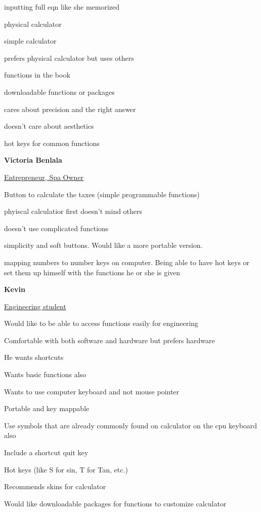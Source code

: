 \documentclass[a4paper, 12pt]{article}
\begin{document}
\begin{compactitem}
\item inputting full eqn like she memorized
\item physical calculator 
\item simple calculator
\item prefers physical calculator but uses others
\item functions in the book
\item downloadable functions or packages
\item cares about precision and the right answer
\item doesn’t care about aesthetics
\item hot keys for common functions
\end{compactitem}
\bigskip

\textbf{Victoria  Benlala}

\underline{Entrepreneur, Spa Owner}

\begin{compactitem}
\item Button to calculate the taxes (simple programmable functions)
\item phyiscal calculatior first doesn’t mind others
\item doesn’t use complicated functions
\item simplicity and soft buttons. Would like a more portable version.
\item mapping numbers to number keys on computer. Being able to have hot keys or set them up himself with the functions he or she is given
\end{compactitem}
\bigskip

\textbf{Kevin}

\underline{Engineering student}

\begin{compactitem}
\item Would like to be able to access functions easily for engineering 
\item Comfortable with both software and hardware but prefers hardware
\item He wants shortcuts
\item Wants basic functions also
\item Wants to use computer keyboard and not mouse pointer
\item Portable and key mappable
\item Use symbols that are already commonly found on calculator on the cpu keyboard also 
\item Include a shortcut quit key
\item Hot keys (like S for sin, T for Tan, etc.)
\item Recommends skins for calculator
\item Would like downloadable packages for functions to customize calculator
\end{compactitem}
\bigskip
\end{document}
